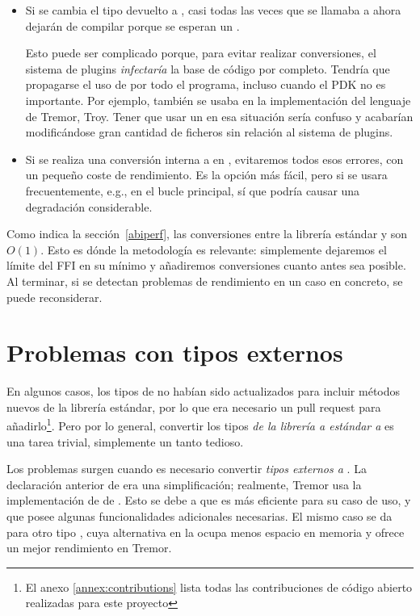 \begin{itemize}
    \item Si se cambia el tipo devuelto a , casi todas las veces
        que se llamaba a  ahora dejarán de compilar porque se
        esperan un .

        Esto puede ser complicado porque, para evitar realizar conversiones, el
        sistema de plugins \emph{infectaría} la base de código por completo.
        Tendría que propagarse el uso de  por todo el programa,
        incluso cuando el PDK no es importante. Por ejemplo, 
        también se usaba en la implementación del lenguaje de Tremor, Troy.
        Tener que usar un  en esa situación sería confuso y
        acabarían modificándose gran cantidad de ficheros sin relación al
        sistema de plugins.

    \item Si se realiza una conversión interna a  en
        , evitaremos todos esos errores, con un pequeño coste de
        rendimiento. Es la opción más fácil, pero si  se
        usara frecuentemente, e.g., en el bucle principal, sí que podría causar
        una degradación considerable.
\end{itemize}

Como indica la sección~\ref{abiperf}, las conversiones entre la librería
estándar y \abistable son $O(1)$. Esto es dónde la metodología \work es
relevante: simplemente dejaremos el límite del FFI en su mínimo y añadiremos
conversiones cuanto antes sea posible. Al terminar, si se detectan problemas de
rendimiento en un caso en concreto, se puede reconsiderar.

\section{Problemas con tipos externos}

En algunos casos, los tipos de \abistable no habían sido actualizados para
incluir métodos nuevos de la librería estándar, por lo que era necesario un pull
request para añadirlo\footnote{El anexo \ref{annex:contributions} lista todas
las contribuciones de código abierto realizadas para este proyecto}. Pero por lo
general, convertir los tipos \emph{de la librería a estándar a \abistable} es
una tarea trivial, simplemente un tanto tedioso.

Los problemas surgen cuando es necesario convertir \emph{tipos externos a
\abistable}. La declaración anterior de  era una simplificación;
realmente, Tremor usa la implementación de  de
. Esto se debe a que es más eficiente para su caso de uso, y
que posee algunas funcionalidades adicionales necesarias. El mismo caso se da
para otro tipo , cuya alternativa en la \crate {} ocupa
menos espacio en memoria y ofrece un mejor rendimiento en Tremor.

